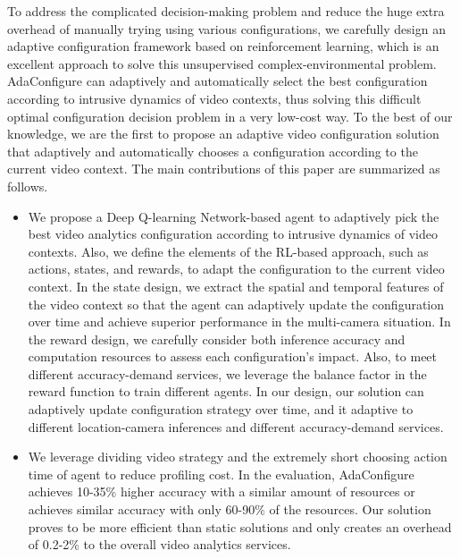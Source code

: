 To address the complicated decision-making problem and reduce the huge extra overhead of manually trying using various configurations, we carefully design an adaptive configuration framework based on reinforcement learning, which is an excellent approach to solve this unsupervised complex-environmental problem. AdaConfigure can adaptively and automatically select the best configuration according to intrusive dynamics of video contexts, thus solving this difficult optimal configuration decision problem in a very low-cost way. To the best of our knowledge, we are the first to propose an adaptive video configuration solution that adaptively and automatically chooses a configuration according to the current video context. The main contributions of this paper are summarized as follows.

\begin{itemize}	
	\item We propose a Deep Q-learning Network-based \cite{DQN} agent to adaptively pick the best video analytics configuration according to intrusive dynamics of video contexts. Also, we define the elements of the RL-based approach, such as actions, states, and rewards, to adapt the configuration to the current video context. In the state design, we extract the spatial and temporal features of the video context so that the agent can adaptively update the configuration over time and achieve superior performance in the multi-camera situation. In the reward design, we carefully consider both inference accuracy and computation resources to assess each configuration's impact. Also, to meet different accuracy-demand services, we leverage the balance factor in the reward function to train different agents. In our design, our solution can adaptively update configuration strategy over time, and it adaptive to different location-camera inferences and different accuracy-demand services. 	
	
	\item We leverage dividing video strategy and the extremely short choosing action time of agent to reduce profiling cost. In the evaluation, AdaConfigure achieves 10-35\% higher accuracy with a similar amount of resources or achieves similar accuracy with only 60-90\% of the resources. Our solution proves to be more efficient than static solutions and only creates an overhead of 0.2-2\% to the overall video analytics services.
\end{itemize}


